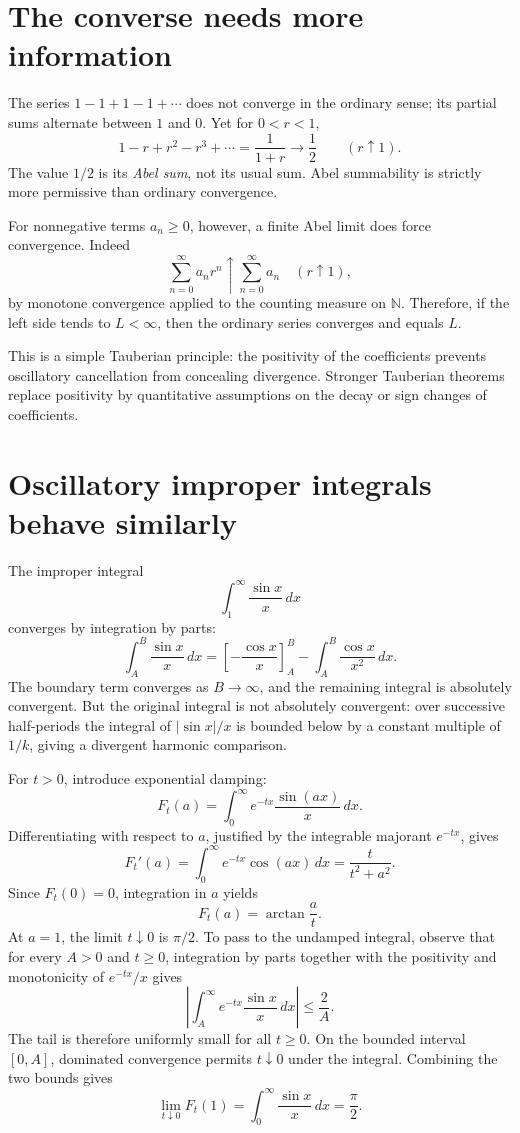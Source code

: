 \section{The converse needs more information}

The series \(1-1+1-1+\cdots\) does not converge in the ordinary sense; its partial sums alternate between \(1\) and \(0\). Yet for \(0<r<1\),
\[
 1-r+r^2-r^3+\cdots=\frac1{1+r}
 \longrightarrow\frac12\qquad(r\uparrow1).
\]
The value \(1/2\) is its \emph{Abel sum}, not its usual sum. Abel summability is strictly more permissive than ordinary convergence.

For nonnegative terms \(a_n\ge0\), however, a finite Abel limit does force convergence. Indeed
\[
 \sum_{n=0}^{\infty}a_nr^n
 \uparrow\sum_{n=0}^{\infty}a_n\quad(r\uparrow1),
\]
by monotone convergence applied to the counting measure on \(\mathbb N\). Therefore, if the left side tends to \(L<\infty\), then the ordinary series converges and equals \(L\).

This is a simple Tauberian principle: the positivity of the coefficients prevents oscillatory cancellation from concealing divergence. Stronger Tauberian theorems replace positivity by quantitative assumptions on the decay or sign changes of coefficients.

\section{Oscillatory improper integrals behave similarly}

The improper integral
\[
 \int_1^\infty\frac{\sin x}{x}\,dx
\]
converges by integration by parts:
\[
 \int_A^B\frac{\sin x}{x}\,dx
 =\left[-\frac{\cos x}{x}\right]_A^B
 -\int_A^B\frac{\cos x}{x^2}\,dx.
\]
The boundary term converges as \(B\to\infty\), and the remaining integral is absolutely convergent. But the original integral is not absolutely convergent: over successive half-periods the integral of \(|\sin x|/x\) is bounded below by a constant multiple of \(1/k\), giving a divergent harmonic comparison.

For \(t>0\), introduce exponential damping:
\[
 F_t(a)=\int_0^\infty e^{-tx}\frac{\sin(ax)}x\,dx.
\]
Differentiating with respect to \(a\), justified by the integrable majorant \(e^{-tx}\), gives
\[
 F_t'(a)=\int_0^\infty e^{-tx}\cos(ax)\,dx
 =\frac{t}{t^2+a^2}.
\]
Since \(F_t(0)=0\), integration in \(a\) yields
\[
 \boxed{F_t(a)=\arctan\frac at.}
\]
At \(a=1\), the limit \(t\downarrow0\) is \(\pi/2\). To pass to the undamped integral, observe that for every \(A>0\) and \(t\ge0\), integration by parts together with the positivity and monotonicity of \(e^{-tx}/x\) gives
\[
 \left|\int_A^\infty e^{-tx}\frac{\sin x}{x}\,dx\right|
 \le\frac{2}{A}.
\]
The tail is therefore uniformly small for all \(t\ge0\). On the bounded interval \([0,A]\), dominated convergence permits \(t\downarrow0\) under the integral. Combining the two bounds gives
\[
 \lim_{t\downarrow0}F_t(1)
 =\int_0^\infty\frac{\sin x}{x}\,dx
 =\boxed{\frac\pi2}.
\]

